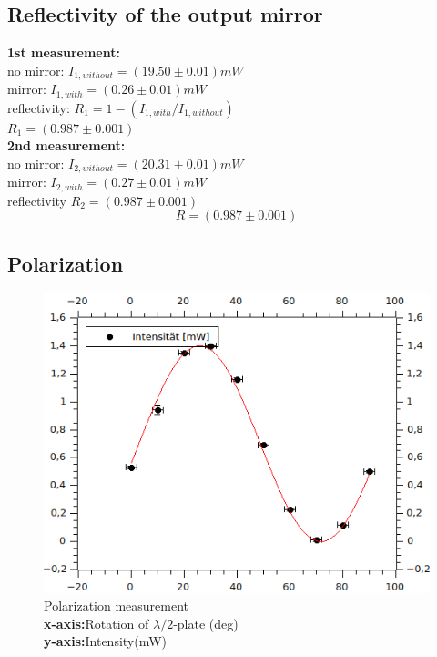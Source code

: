 \documentclass[12pt,a4paper]{article}
\begin{document}
\begin{multicols}{2}
\subsection{Reflectivity of the output mirror}
\textbf{1st measurement:}\\
no mirror: $I_{1,without} = (19.50 \pm 0.01)mW$\\
mirror: $I_{1,with} = (0.26 \pm 0.01)mW$\\
reflectivity: $R_1 = 1-(I_{1,with}/I_{1,without})$\\
$R_1 = (0.987 \pm 0.001)$\\

\noindent \textbf{2nd measurement:}\\
no mirror: $I_{2,without} = (20.31 \pm 0.01)mW$\\
mirror: $I_{2,with} = (0.27 \pm 0.01)mW$\\
reflectivity $R_2 = (0.987 \pm 0.001)$\\
$$R = (0.987 \pm 0.001)$$



\subsection{Polarization}
\begin{figure}[H]
 \centering
 \includegraphics[scale=0.46]{./figures/pol_sinfit.png}
 \caption{Polarization measurement\\ \textbf{x-axis:}Rotation of $\lambda/2$-plate (deg)\\
\textbf{y-axis:}Intensity(mW)}
 \label{fig:shape_measure}
\end{figure}


\end{multicols}
\end{document}
